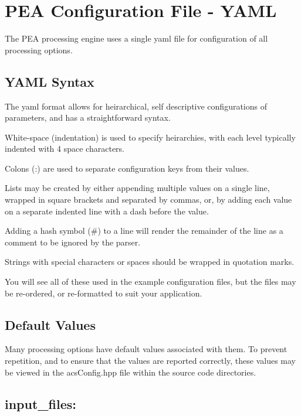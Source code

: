 











\chapter{PEA Configuration File - YAML}
	
The PEA processing engine uses a single yaml file for configuration of all processing options.

\section{YAML Syntax}
The yaml format allows for heirarchical, self descriptive configurations of parameters, and has a straightforward syntax.

White-space (indentation) is used to specify heirarchies, with each level typically indented with 4 space characters.

Colons (:) are used to separate configuration keys from their values.

Lists may be created by either appending multiple values on a single line, wrapped in square brackets and separated by commas, or, by adding each value on a separate indented line with a dash before the value.

Adding a hash symbol (\#) to a line will render the remainder of the line as a comment to be ignored by the parser.

Strings with special characters or spaces should be wrapped in quotation marks.

You will see all of these used in the example configuration files, but the files may be re-ordered, or re-formatted to suit your application.

\section{Default Values}

Many processing options have default values associated with them. To prevent repetition, and to ensure that the values are reported correctly, these values may be viewed in the acsConfig.hpp file within the source code directories.

\section{input\_files:}

